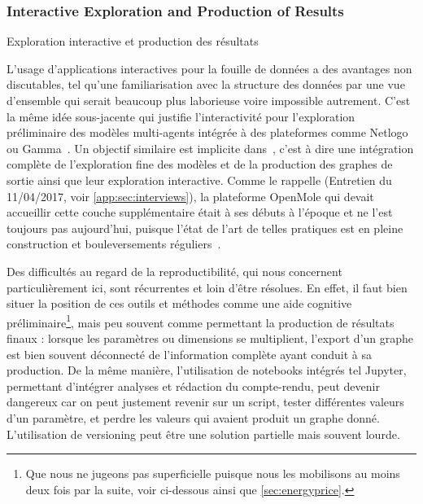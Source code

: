 \subsubsection{Interactive Exploration and Production of Results}{Exploration interactive et production des résultats}

L'usage d'applications interactives pour la fouille de données a des avantages non discutables, tel qu'une familiarisation avec la structure des données par une vue d'ensemble qui serait beaucoup plus laborieuse voire impossible autrement. C'est la même idée sous-jacente qui justifie l'interactivité pour l'exploration préliminaire des modèles multi-agents intégrée à des plateformes comme Netlogo~\cite{wilensky1999netlogo} ou Gamma~\cite{drogoul2013gama}. Un objectif similaire est implicite dans~\cite{rey2015plateforme}, c'est à dire une intégration complète de l'exploration fine des modèles et de la production des graphes de sortie ainsi que leur exploration interactive. Comme le rappelle  (Entretien du 11/04/2017, voir \ref{app:sec:interviews}), la plateforme OpenMole qui devait accueillir cette couche supplémentaire était à ses débuts à l'époque et ne l'est toujours pas aujourd'hui, puisque l'état de l'art de telles pratiques est en pleine construction et bouleversements réguliers~\cite{holzinger2014knowledge}.


Des difficultés au regard de la reproductibilité, qui nous concernent particulièrement ici, sont récurrentes et loin d'être résolues. En effet, il faut bien situer la position de ces outils et méthodes comme une aide cognitive préliminaire\footnote{Que nous ne jugeons pas superficielle puisque nous les mobilisons au moins deux fois par la suite, voir ci-dessous ainsi que \ref{sec:energyprice}.}, mais peu souvent comme permettant la production de résultats finaux : lorsque les paramètres ou dimensions se multiplient, l'export d'un graphe est bien souvent déconnecté de l'information complète ayant conduit à sa production. De la même manière, l'utilisation de notebooks intégrés tel Jupyter, permettant d'intégrer analyses et rédaction du compte-rendu, peut devenir dangereux car on peut justement revenir sur un script, tester différentes valeurs d'un paramètre, et perdre les valeurs qui avaient produit un graphe donné. L'utilisation de versioning peut être une solution partielle mais souvent lourde.


